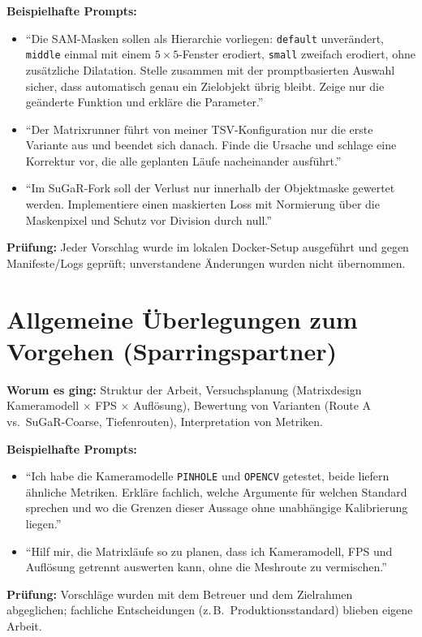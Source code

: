 \documentclass[12pt,a4paper]{article}
\begin{document}
\textbf{Beispielhafte Prompts:}
\begin{itemize}
  \item \enquote{Die SAM-Masken sollen als Hierarchie vorliegen: \texttt{default} unverändert, \texttt{middle} einmal mit einem $5\times5$-Fenster erodiert, \texttt{small} zweifach erodiert, ohne zusätzliche Dilatation. Stelle zusammen mit der promptbasierten Auswahl sicher, dass automatisch genau ein Zielobjekt übrig bleibt. Zeige nur die geänderte Funktion und erkläre die Parameter.}
  \item \enquote{Der Matrixrunner führt von meiner TSV-Konfiguration nur die erste Variante aus und beendet sich danach. Finde die Ursache und schlage eine Korrektur vor, die alle geplanten Läufe nacheinander ausführt.}
  \item \enquote{Im SuGaR-Fork soll der Verlust nur innerhalb der Objektmaske gewertet werden. Implementiere einen maskierten Loss mit Normierung über die Maskenpixel und Schutz vor Division durch null.}
\end{itemize}

\textbf{Prüfung:} Jeder Vorschlag wurde im lokalen Docker-Setup ausgeführt und gegen Manifeste/Logs geprüft; unverstandene Änderungen wurden nicht übernommen.

\section{Allgemeine Überlegungen zum Vorgehen (Sparringspartner)}

\textbf{Worum es ging:} Struktur der Arbeit, Versuchsplanung (Matrixdesign Kameramodell $\times$ FPS $\times$ Auflösung), Bewertung von Varianten (Route A vs.\ SuGaR-Coarse, Tiefenrouten), Interpretation von Metriken.

\textbf{Beispielhafte Prompts:}
\begin{itemize}
  \item \enquote{Ich habe die Kameramodelle \texttt{PINHOLE} und \texttt{OPENCV} getestet, beide liefern ähnliche Metriken. Erkläre fachlich, welche Argumente für welchen Standard sprechen und wo die Grenzen dieser Aussage ohne unabhängige Kalibrierung liegen.}
  \item \enquote{Hilf mir, die Matrixläufe so zu planen, dass ich Kameramodell, FPS und Auflösung getrennt auswerten kann, ohne die Meshroute zu vermischen.}
\end{itemize}

\textbf{Prüfung:} Vorschläge wurden mit dem Betreuer und dem Zielrahmen abgeglichen; fachliche Entscheidungen (z.\,B.\ Produktionsstandard) blieben eigene Arbeit.
\end{document}
